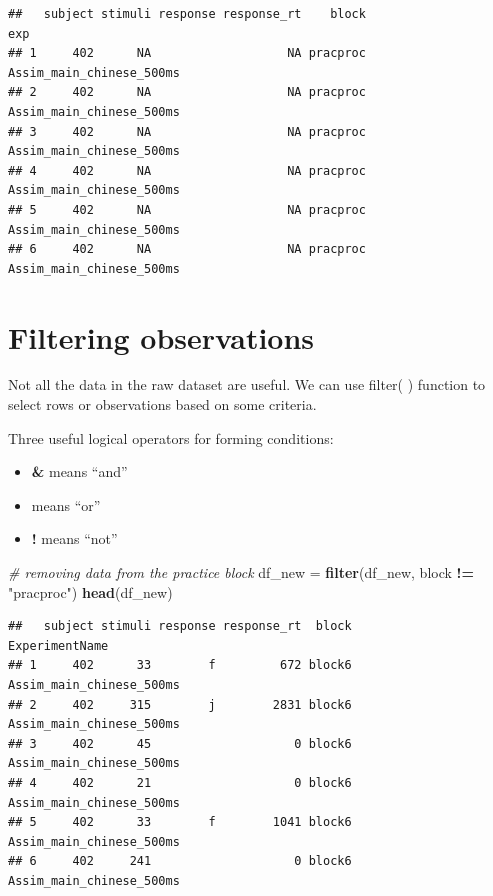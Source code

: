 \documentclass[]{book}
\newenvironment{Shaded}{\begin{snugshade}}{\end{snugshade}}
\newcommand{\KeywordTok}[1]{\textcolor[rgb]{0.13,0.29,0.53}{\textbf{#1}}}
\newcommand{\StringTok}[1]{\textcolor[rgb]{0.31,0.60,0.02}{#1}}
\newcommand{\CommentTok}[1]{\textcolor[rgb]{0.56,0.35,0.01}{\textit{#1}}}
\newcommand{\OperatorTok}[1]{\textcolor[rgb]{0.81,0.36,0.00}{\textbf{#1}}}
\newcommand{\NormalTok}[1]{#1}
\begin{document}
\begin{verbatim}
##   subject stimuli response response_rt    block                      exp
## 1     402      NA                   NA pracproc Assim_main_chinese_500ms
## 2     402      NA                   NA pracproc Assim_main_chinese_500ms
## 3     402      NA                   NA pracproc Assim_main_chinese_500ms
## 4     402      NA                   NA pracproc Assim_main_chinese_500ms
## 5     402      NA                   NA pracproc Assim_main_chinese_500ms
## 6     402      NA                   NA pracproc Assim_main_chinese_500ms
\end{verbatim}

\section{Filtering observations}\label{filtering-observations}

Not all the data in the raw dataset are useful. We can use filter( )
function to select rows or observations based on some criteria.

Three useful logical operators for forming conditions:

\begin{itemize}
\item
  \textbf{\&} means ``and''
\item
  \textbf{\textbar{}} means ``or''
\item
  \textbf{!} means ``not''
\end{itemize}

\begin{Shaded}
\begin{Highlighting}[]
\CommentTok{# removing data from the practice block}
\NormalTok{df_new =}\StringTok{ }\KeywordTok{filter}\NormalTok{(df_new, block }\OperatorTok{!=}\StringTok{ "pracproc"}\NormalTok{)}
\KeywordTok{head}\NormalTok{(df_new)}
\end{Highlighting}
\end{Shaded}

\begin{verbatim}
##   subject stimuli response response_rt  block           ExperimentName
## 1     402      33        f         672 block6 Assim_main_chinese_500ms
## 2     402     315        j        2831 block6 Assim_main_chinese_500ms
## 3     402      45                    0 block6 Assim_main_chinese_500ms
## 4     402      21                    0 block6 Assim_main_chinese_500ms
## 5     402      33        f        1041 block6 Assim_main_chinese_500ms
## 6     402     241                    0 block6 Assim_main_chinese_500ms
\end{verbatim}
\end{document}
